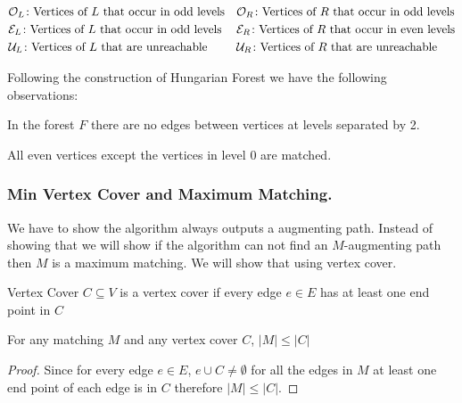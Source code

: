 \begin{align*}
	&\mathcal{O}_L\colon\text{Vertices of $L$ that occur in odd levels}&& \mathcal{O}_R\colon\text{Vertices of $R$ that occur in odd levels}\\
	&\mathcal{E}_L\colon\text{Vertices of $L$ that occur in odd levels}&& \mathcal{E}_R\colon\text{Vertices of $R$ that occur in even levels}\\
	&\mathcal{U}_L\colon\text{Vertices of $L$ that are unreachable}&& \mathcal{U}_R\colon\text{Vertices of $R$ that are unreachable}
\end{align*}


Following the construction of Hungarian Forest we have the following observations:

\begin{observation}
	In the forest $F$ there are no edges between vertices at levels separated by 2. 
\end{observation}
\begin{observation}\label{evens-matched}
	All even vertices except the vertices in level 0 are matched.
\end{observation}

\subsubsection{Min Vertex Cover and Maximum Matching.}
We have to  show the algorithm always outputs a augmenting path. Instead of showing that we will show if the algorithm can not find an $M$-augmenting path then $M$ is a maximum matching. We will show that using vertex cover.

\begin{Definition}{Vertex Cover}{}
	$C\subseteq V$ is a vertex cover if every edge $e\in E$ has at least one end point in $C$
\end{Definition}
\begin{lemma}{}{}
	For any matching $M$ and any vertex cover $C$, $|M|\leq |C|$
\end{lemma}
\begin{proof}
	Since for every edge $e\in E$, $e\cup C\neq \emptyset$ for all the edges in $M$ at least one end point of each edge is in $C$ therefore $|M|\leq |C|$.
\end{proof}

